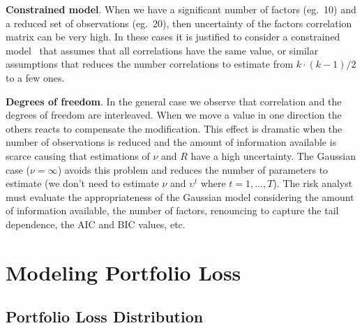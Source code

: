 \documentclass[11pt,fleqn]{book} %
\begin{document}
\textbf{Constrained model}. When we have a significant number of factors 
(eg.\ 10) and a reduced set of observations (eg.\ 20), then uncertainty of 
the factors correlation matrix can be very high. In these cases it is 
justified to consider a constrained model~\cite{roncalli:2004} that 
assumes that all correlations have the same value, or similar assumptions 
that reduces the number correlations to estimate from $k \cdot(k-1)/2$ to 
a few ones.

\textbf{Degrees of freedom}. In the general case we observe that
correlation and the degrees of freedom are interleaved. When we move a value
in one direction the others reacts to compensate the modification. This
effect is dramatic when the number of observations is reduced and the amount 
of information available is scarce causing that estimations of $\nu$ and $R$
have a high uncertainty. The Gaussian case ($\nu = \infty$) avoids this 
problem and reduces the number of parameters to estimate (we don't need to 
estimate $\nu$ and $\upsilon^t$ where $t=1,\dots,T$). 
The risk analyst must evaluate the appropriateness of the Gaussian model 
considering the amount of information available, the number of factors, 
renouncing to capture the tail dependence, the AIC and BIC values, etc.


\chapter{Modeling Portfolio Loss}

\section{Portfolio Loss Distribution}
\end{document}
